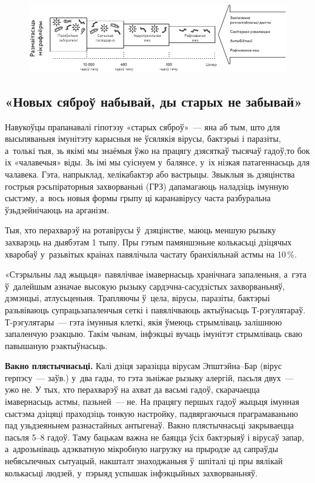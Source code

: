
\begin{figure}[htb!]
  \centering
  \includegraphics[width=\textwidth]{willpower/ch2/8.pdf}
\end{figure}

\subsection*{«Новых сяброў набывай, ды старых не забывай»}

Навукоўцы прапанавалі гіпотэзу «старых сяброў»~--- яна аб тым, што для высьпяваньня імунітэту карысныя не ўсялякія вірусы, бактэрыі і паразіты, а~толькі тыя, зь якімі мы знаёмыя ўжо на працягу дзясяткаў тысячаў гадоў,то бок іх «чалавечыя» віды. Зь імі мы суіснуем у~балянсе, у~іх нізкая патагеннасьць для чалавека. Гэта, напрыклад, хелікабактэр або вастрыцы. Звыклыя зь дзяцінства гострыя рэсьпіраторныя захворваньні (ГРЗ) дапамагаюць наладзіць імунную сыстэму, а~вось новыя формы грыпу ці каранавірусу часта разбуральна ўзьдзейнічаюць на арганізм. 

Тыя, хто перахварэў на ротавірусы ў~дзяцінстве, маюць меншую рызыку захварэць на дыябэтам 1 тыпу. Пры гэтым памяншэньне колькасьці дзіцячых хваробаў у~разьвітых краінах павялічыла частату бранхіяльнай астмы на 10\,\%.

«Стэрыльны лад жыцьця» павялічвае імавернасьць хранічнага запаленьня, а~гэта ў~далейшым азначае высокую рызыку сардэчна-сасудзістых захворваньняў, дэмэнцыі, атлусьценьня. Трапляючы ў~цела, вірусы, паразіты, бактэрыі разьвіваюць супрацьзапаленчыя сеткі і павялічваюць актыўнасьць Т-рэгулятараў. Т-рэгулятары~--- гэта імунныя клеткі, якія ўмеюць стрымліваць залішнюю запаленчую рэакцыю. Такім чынам, інфэкцыі вучаць імунітэт стрымліваць сваю павышаную рэактыўнасьць.

\textbf{Вакно плястычнасьці.} Калі дзіця заразіцца вірусам Эп\-штэй\-на--Бар (вірус герпэсу~--- заўв.) у~два гады, то гэта зьніжае рызыку алергій, пасьля двух~--- ужо не. У тых, хто перахварэў на ахват да васьмі гадоў, скарачаецца імавернасьць астмы, пазьней~--- не. На працягу першых гадоў жыцьця імунная сыстэма дзіцяці праходзіць тонкую настройку, падвяргаючыся праграмаваньню пад узьдзеяньнем разнастайных антыгенаў. Вакно плястычнасьці закрываецца пасьля 5--8 гадоў. Таму бацькам важна не баяцца ўсіх бактэрыяў і вірусаў запар, а~адрозьніваць адэкватную мікробную нагрузку на прыродзе ад сапраўды небясьпечных сытуацый, накшталт знаходжаньня ў~шпіталі ці пры вялікай колькасьці людзей, у~пэрыяд успышак інфэкцыйных захворваньняў.

